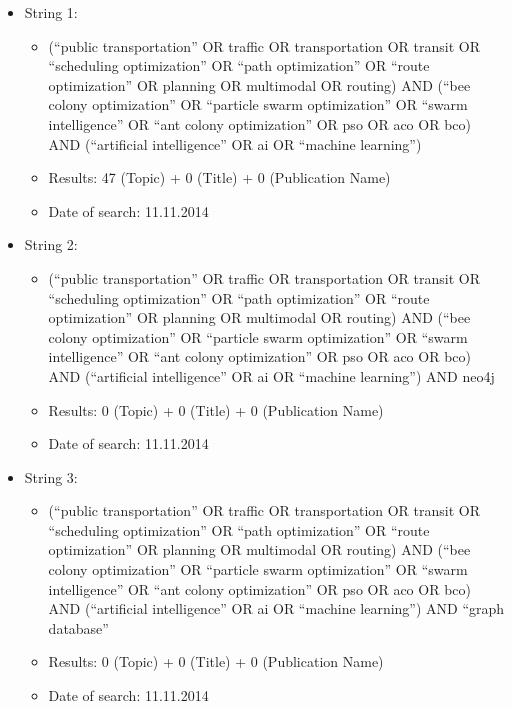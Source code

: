 \begin{itemize}
	\item String 1: 
	\begin{itemize}
		\item (``public transportation'' OR traffic OR transportation OR transit OR ``scheduling optimization'' OR ``path optimization'' OR ``route optimization'' OR planning OR multimodal OR routing) AND (``bee colony optimization'' OR ``particle swarm optimization'' OR ``swarm intelligence'' OR ``ant colony optimization'' OR pso OR aco OR bco) AND (``artificial intelligence'' OR ai OR ``machine learning'')
		\item Results: 47 (Topic) + 0 (Title) + 0 (Publication Name)
		\item Date of search: 11.11.2014
	\end{itemize}
	\item String 2:
	\begin{itemize}
		\item (``public transportation'' OR traffic OR transportation OR transit OR ``scheduling optimization'' OR ``path optimization'' OR ``route optimization'' OR planning OR multimodal OR routing) AND (``bee colony optimization'' OR ``particle swarm optimization'' OR ``swarm intelligence'' OR ``ant colony optimization'' OR pso OR aco OR bco) AND (``artificial intelligence'' OR ai OR ``machine learning'') AND neo4j
		\item Results: 0 (Topic) + 0 (Title) + 0 (Publication Name)
		\item Date of search: 11.11.2014
	\end{itemize}
	\item String 3:
	\begin{itemize}
		\item (``public transportation'' OR traffic OR transportation OR transit OR ``scheduling optimization'' OR ``path optimization'' OR ``route optimization'' OR planning OR multimodal OR routing) AND (``bee colony optimization'' OR ``particle swarm optimization'' OR ``swarm intelligence'' OR ``ant colony optimization'' OR pso OR aco OR bco) AND (``artificial intelligence'' OR ai OR ``machine learning'') AND ``graph database''
		\item Results: 0 (Topic) + 0 (Title) + 0 (Publication Name)
		\item Date of search: 11.11.2014
	\end{itemize}
\end{itemize}



